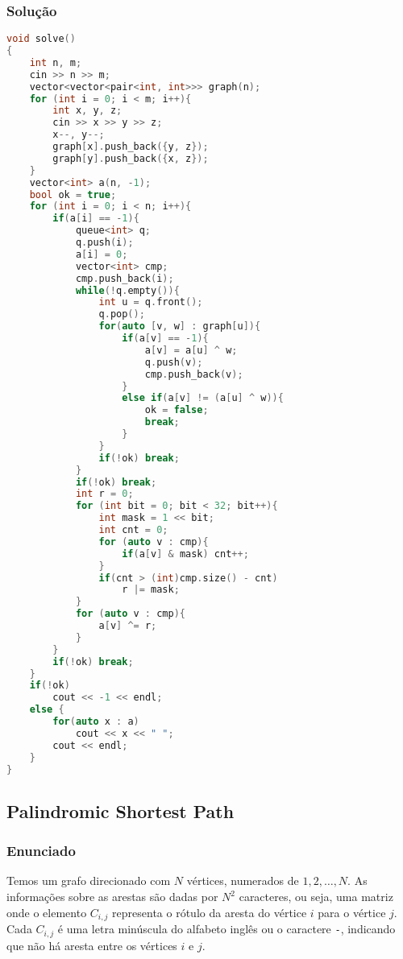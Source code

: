 \subsubsection*{Solução}
\begin{lstlisting}[language=C++]
void solve()
{
    int n, m; 
    cin >> n >> m;
    vector<vector<pair<int, int>>> graph(n);
    for (int i = 0; i < m; i++){
        int x, y, z; 
        cin >> x >> y >> z;
        x--, y--;
        graph[x].push_back({y, z});
        graph[y].push_back({x, z});
    }
    vector<int> a(n, -1);
    bool ok = true;
    for (int i = 0; i < n; i++){
        if(a[i] == -1){
            queue<int> q;
            q.push(i);
            a[i] = 0;
            vector<int> cmp;
            cmp.push_back(i);
            while(!q.empty()){
                int u = q.front(); 
                q.pop();
                for(auto [v, w] : graph[u]){
                    if(a[v] == -1){
                        a[v] = a[u] ^ w;
                        q.push(v);
                        cmp.push_back(v);
                    }
                    else if(a[v] != (a[u] ^ w)){
                        ok = false;
                        break;
                    }
                }
                if(!ok) break;
            }
            if(!ok) break;
            int r = 0;
            for (int bit = 0; bit < 32; bit++){
                int mask = 1 << bit;
                int cnt = 0;
                for (auto v : cmp){
                    if(a[v] & mask) cnt++;
                }
                if(cnt > (int)cmp.size() - cnt)
                    r |= mask;
            }
            for (auto v : cmp){
                a[v] ^= r;
            }
        }
        if(!ok) break;
    }
    if(!ok)
        cout << -1 << endl;
    else {
        for(auto x : a)
            cout << x << " ";
        cout << endl;
    }
}
\end{lstlisting}

\subsection{Palindromic Shortest Path}

\subsubsection*{Enunciado}
Temos um grafo direcionado com \(N\) vértices, numerados de \(1, 2, \dots, N\). As informações sobre as arestas são dadas por \(N^2\) caracteres, ou seja, uma matriz onde o elemento \(C_{i,j}\) representa o rótulo da aresta do vértice \(i\) para o vértice \(j\). Cada \(C_{i,j}\) é uma letra minúscula do alfabeto inglês ou o caractere \texttt{-}, indicando que não há aresta entre os vértices \(i\) e \(j\).

